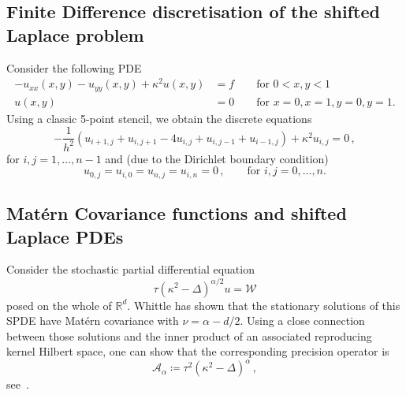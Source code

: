 \documentclass[
fontsize=11pt,
paper=a4,
numbers=noenddot
]{scrartcl}
\begin{document}
\subsection{Finite Difference discretisation of the shifted Laplace problem}
Consider the following PDE
\begin{align*}
    -u_{xx}(x,y) - u_{yy}(x,y) + \kappa^2 u(x,y) &= f \qquad \text{for $0 < x,y < 1$} \\
    u(x,y) &= 0 \qquad \text{for $x = 0, x = 1, y = 0, y = 1$.}
\end{align*}
Using a classic 5-point stencil, we obtain the discrete equations
\begin{equation*}
    -\frac{1}{h^2}\left(
        u_{i+1,j} + u_{i,j+1} - 4u_{i,j} + u_{i,j-1} + u_{i-1,j}
    \right)
    + \kappa^2 u_{i,j} = 0\,,
\end{equation*}
for $i,j = 1,\dotsc,n-1$ and (due to the Dirichlet boundary condition)
\begin{equation*}
    u_{0,j} = u_{i,0} = u_{n,j} = u_{i,n} = 0\,, \qquad\text{for $i,j = 0,\dotsc,n$.} 
\end{equation*}

\subsection*{Mat\'ern Covariance functions and shifted Laplace PDEs}
Consider the stochastic partial differential equation
\begin{equation*}
    \tau {(\kappa^2 - \Delta)}^{\alpha / 2} u = \mathcal{W}
\end{equation*}
posed on the whole of $\mathbb{R}^d$. Whittle has shown that the stationary solutions of this SPDE have Mat\'ern covariance with $\nu = \alpha - d/2$. Using a close connection between those solutions and the inner product of an associated reproducing kernel Hilbert space, one can show that the corresponding precision operator is
\begin{equation*}
    \mathcal{A}_\alpha \coloneqq \tau^2 {(\kappa^2 - \Delta)}^\alpha\,,
\end{equation*}
see~\cite[Sec.\ 2.2]{lindgrenSPDEApproachGaussian2022}.


\printbibliography
\end{document}
